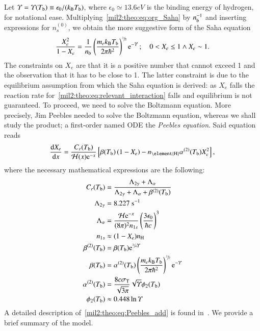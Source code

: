     Let $\varUpsilon= \varUpsilon(T_\mathrm{b})\equiv \epsilon_0/(k_\mathrm{B} T_\mathrm{b})$, where $\epsilon_0 \simeq 13.6\unit{eV}$ is the binding energy of hydrogen, for notational ease. Multiplying~\cref{mil2:theo:eq:org_Saha} by $n_\mathrm{b}^{-1}$ and inserting expressions for $n_s^{(0)}$, we obtain the more suggestive form of the Saha equation
    \begin{equation}\label{mil2:theo:eq:Saha}
        \frac{X_e^2}{1-X_e}= \frac{1}{n\ped{b}}\left(\frac{m_e k\ped{B} T\ped{b}}{2\pi \hbar^2} \right)^{\sfrac{3}{2}} \eu^{-\epskT}\,; \quad   0 < X_e \leq 1 \wedge X_e\sim 1.
    \end{equation}
    The constraints on $X_e$ are that it is a positive number that cannot exceed 1 and the observation that it has to be close to 1. The latter constraint is due to the equilibrium assumption from which the Saha equation is derived: as $X_e$ falls the reaction rate for~\cref{mil2:theo:eq:relevant_interaction} falls and equilibrium is not guaranteed. To proceed, we need to solve the Boltzmann equation. More precisely, Jim Peebles needed to solve the Boltzmann equation, whereas we shall study the product; a first-order named ODE the \textit{Peebles equation}. Said equation reads
    \begin{equation}\label{mil2:theo:eq:Peebles}
        \dv{X_e}{x} = \frac{C_r(T\ped{b})}{\Hp(x)\eu^{-x}} \left[ \beta(T\ped{b}) \left(1-X_e\right) - n\ped{\element{H}} \alpha^{(2)}(T\ped{b})X_e^2 \right],
    \end{equation}
    where the necessary mathematical expressions are the following:
    \begin{subequations}\label{mil2:theo:eq:Peebles_add}
        \begin{align}
            C_r(T\ped{b}) &= \frac{\Lambda_{2\gamma}+ \Lambda_{\alpha}}{\Lambda_{2\gamma} + \Lambda_\alpha + \beta^{(2)}(T\ped{b})} \label{mil2:theo:eq:Peebles_Cr} \\
            \Lambda_{2\gamma} &=8.227\unit{s}^{-1} \label{mil2:theo:eq:Peebles_Lambda_2s1s}  \\
            \Lambda_\alpha &= \frac{\Hp\eu^{-x}}{(8\pi)^2 n_{1s}}\left( \frac{3\epsilon_0}{\hbar c}\right)^3 \label{mil2:theo:eq:Peebles_Lambda_alpha}  \\
            n_{1s} &\approx (1-X_e)n\ped{H}\label{mil2:theo:eq:Peebles_n1s}\\
            \beta^{(2)}(T\ped{b}) &= \beta(T\ped{b})\eu^{\sfrac{3}{4}\epskT} \label{mil2:theo:eq:Peebles_beta2} \\
            \beta (T\ped{b}) &= \alpha^{(2)}(T\ped{b}) \left(\frac{m_e k\ped{B} T\ped{b}}{2\pi \hbar^2} \right)^{\sfrac{3}{2}} \eu^{-\epskT} \label{mil2:theo:eq:Peebles_beta}  \\
            \alpha^{(2)}(T\ped{b}) &= \frac{8 c\sigma\ped{T} }{\sqrt{3\pi}}\sqrt{\epskT} \phi_2(T\ped{b}) \label{mil2:theo:eq:Peebles_alpha2} \\
            \phi_2(T\ped{b}) &\approx 0.448\ln{\epskT} \label{mil2:theo:eq:Peebles_phi2}
        \end{align}
    \end{subequations}
    A detailed description of~\cref{mil2:theo:eq:Peebles_add} is found in~\citet{Peebles1968}. We provide a brief summary of the model.
    
